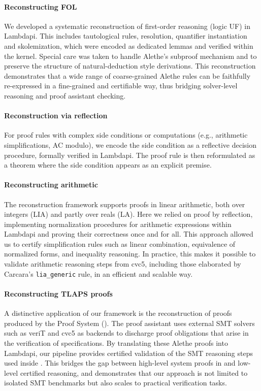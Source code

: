 \paragraph{Reconstructing FOL}
We developed a systematic reconstruction of first-order reasoning (logic UF) in Lambdapi.
This includes tautological rules, resolution, quantifier instantiation and skolemization, which were encoded as dedicated lemmas and verified within the kernel.
Special care was taken to handle Alethe’s subproof mechanism and to preserve the structure of natural-deduction style derivations.
This reconstruction demonstrates that a wide range of coarse-grained Alethe rules can be faithfully re-expressed in a fine-grained and certifiable way, thus bridging solver-level reasoning and proof assistant checking.

\paragraph{Reconstruction via reflection}
For proof rules with complex side conditions or computations (e.g., arithmetic simplifications, AC modulo), we encode the side condition as a reflective decision procedure, formally verified in Lambdapi.
The proof rule is then reformulated as a theorem where the side condition appears as an explicit premise.

\paragraph{Reconstructing arithmetic}
The reconstruction framework supports proofs in linear arithmetic, both over integers (LIA) and partly over reals (LA).
Here we relied on proof by reflection, implementing normalization procedures for arithmetic expressions within Lambdapi and proving their correctness once and for all.
This approach allowed us to certify simplification rules such as linear combination, equivalence of normalized forms, and inequality reasoning.
In practice, this makes it possible to validate arithmetic reasoning steps from cvc5, including those elaborated by Carcara’s \texttt{lia\_generic} rule, in an efficient and scalable way.

\paragraph{Reconstructing TLAPS proofs}
A distinctive application of our framework is the reconstruction of proofs produced by the \tlaplus Proof System (\tlaps).
The proof assistant \tlaps uses external SMT solvers such as veriT and cvc5 as backends to discharge proof obligations that arise in the verification of \tlaplus specifications.
By translating these Alethe proofs into Lambdapi, our pipeline provides certified validation of the SMT reasoning steps used inside \tlaps.
This bridges the gap between high-level system proofs in \tlaplus and low-level certified reasoning, and demonstrates that our approach is not limited to isolated SMT benchmarks but also scales to practical verification tasks.

